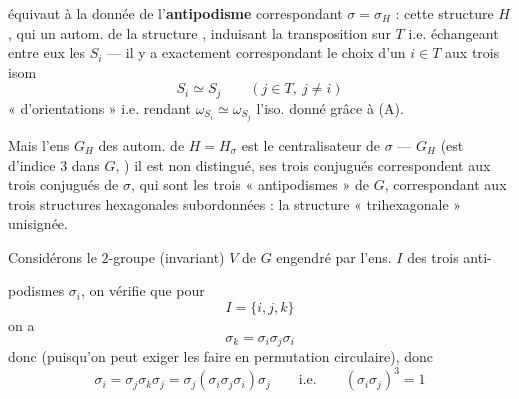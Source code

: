 \documentclass[11pt,a4paper]{article}
\begin{document}
 équivaut à la donnée de l'\textbf{antipodisme}
correspondant $\sigma = \sigma_H$ : cette structure $H$, qui
\struck{\ill{}}  un autom.  de la structure
, induisant la transposition sur $T$ i.e. échangeant
entre eux les $S_i$ --- il y a exactement \ill{} correspondant \ill{} le choix
d'un $i \in T$ aux trois isom
\[
  S_i \simeq S_j \qquad (j \in T,\ j \neq i)
\]
«  d'orientations » i.e. rendant
$\omega_{S_i} \simeq \omega_{S_j}$ l'iso. donné grâce à (A). 




Mais l'ens $G_H$ des autom. de $H = H_\sigma$ est le centralisateur de
$\sigma$  --- $G_H$ (est d'indice $3$ dans $G$,
) il est non distingué,
ses trois conjugués correspondent aux trois conjugués de $\sigma$, qui sont
les trois « antipodismes » de $G$, correspondant aux trois structures
hexagonales subordonnées : la structure « trihexagonale » unisignée.


Considérons le $2$-groupe (invariant) $V$ de $G$ engendré par l'ens. $I$ des trois anti-


podismes $\sigma_i$, on vérifie que pour
\[
  I = \{i, j, k\}
\]
on a
\[
  \sigma_k = \sigma_i \sigma_j \sigma_i
\]
donc (puisqu'on peut exiger les faire en permutation circulaire), donc
\[
  \sigma_i = \sigma_j \sigma_k \sigma_j = \sigma_j (\sigma_i \sigma_j \sigma_i) \sigma_j
  \qquad \text{i.e.} \qquad
  (\sigma_i \sigma_j)^3 = 1
\]
\end{document}
